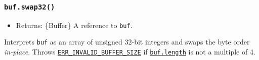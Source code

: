\begin{Shaded}
\begin{Highlighting}[]
\NormalTok{ \{ }\NormalTok{ \} }\OperatorTok{=} \NormalTok{(}\NormalTok{)}\OperatorTok{;}

\OperatorTok{=} \NormalTok{(}\OperatorTok{,} \NormalTok{)}\OperatorTok{;}
\NormalTok{()}\OperatorTok{;} 
\end{Highlighting}
\end{Shaded}

\subsubsection{\texorpdfstring{\texttt{buf.swap32()}}{buf.swap32()}}\label{buf.swap32}

\begin{itemize}
\tightlist
\item
  Returns: \{Buffer\} A reference to \texttt{buf}.
\end{itemize}

Interprets \texttt{buf} as an array of unsigned 32-bit integers and
swaps the byte order \emph{in-place}. Throws
\href{errors.md\#err_invalid_buffer_size}{\texttt{ERR\_INVALID\_BUFFER\_SIZE}}
if \hyperref[buflength]{\texttt{buf.length}} is not a multiple of 4.

